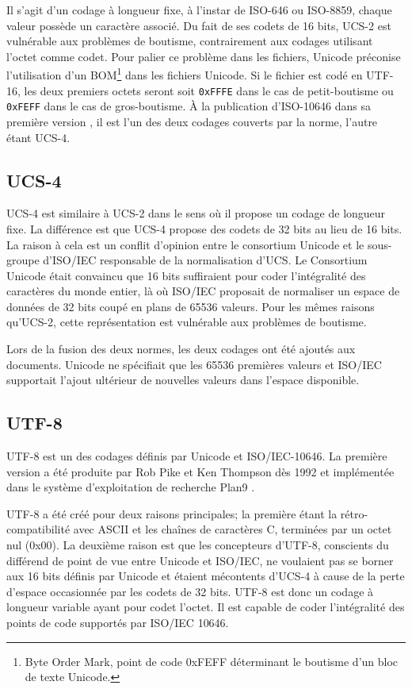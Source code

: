 Il s'agit d'un codage à longueur fixe, à l'instar de ISO-646 ou ISO-8859, chaque valeur possède
un caractère associé.
Du fait de ses codets de 16 bits, UCS-2 est vulnérable aux problèmes de boutisme, contrairement
aux codages utilisant l'octet comme codet.
Pour palier ce problème dans les fichiers, Unicode préconise l'utilisation d'un
BOM\footnote{Byte Order Mark, point de code 0xFEFF déterminant le boutisme d'un bloc de texte Unicode.}
dans les fichiers Unicode.
Si le fichier est codé en UTF-16, les deux premiers octets seront soit \texttt{0xFFFE} dans le cas de
petit-boutisme ou \texttt{0xFEFF} dans le cas de gros-boutisme.
À la publication d'ISO-10646 dans sa première version \cite{UCS1993}, il est l'un des deux codages couverts
par la norme, l'autre étant UCS-4.

\subsection{UCS-4}

UCS-4 est similaire à UCS-2 dans le sens où il propose un codage de longueur fixe.
La différence est que UCS-4 propose des codets de 32 bits au lieu de 16 bits.
La raison à cela est un conflit d'opinion entre le consortium Unicode et
le sous-groupe d'ISO/IEC responsable de la normalisation d'UCS.
Le Consortium Unicode était convaincu que 16 bits suffiraient pour coder l'intégralité
des caractères du monde entier, là où ISO/IEC proposait de normaliser un espace de
données de 32 bits coupé en plans de 65536 valeurs.
Pour les mêmes raisons qu'UCS-2, cette représentation est vulnérable aux problèmes de
boutisme.

Lors de la fusion des deux normes, les deux codages ont été ajoutés aux documents.
Unicode ne spécifiait que les 65536 premières valeurs et ISO/IEC supportait l'ajout
ultérieur de nouvelles valeurs dans l'espace disponible.

\subsection{UTF-8}

UTF-8 est un des codages définis par Unicode et ISO/IEC-10646.
La première version a été produite par Rob Pike et Ken Thompson dès
1992 et implémentée dans le système d'exploitation de recherche Plan9 \cite{Plan9}.

UTF-8 a été créé pour deux raisons principales; la première étant la rétro-compatibilité avec
ASCII et les chaînes de caractères C, terminées par un octet nul (0x00).
La deuxième raison est que les concepteurs d'UTF-8, conscients du différend de point
de vue entre Unicode et ISO/IEC, ne voulaient pas se borner aux 16 bits définis par
Unicode et étaient mécontents d'UCS-4 à cause de la perte d'espace occasionnée par les codets de 32 bits.
UTF-8 est donc un codage à longueur variable ayant pour codet l'octet.
Il est capable de coder l'intégralité des points de code supportés par ISO/IEC 10646.

